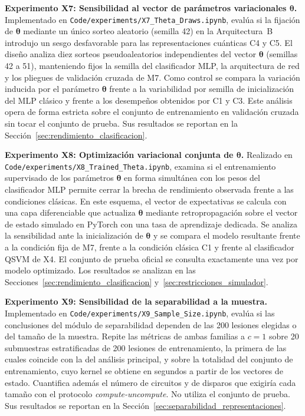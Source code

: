 \textbf{Experimento X7: Sensibilidad al vector de parámetros variacionales $\boldsymbol\theta$.} Implementado en
\texttt{Code/}\allowbreak\texttt{experiments/}\allowbreak\texttt{X7\_Theta\_Draws.ipynb}, evalúa si la fijación de $\boldsymbol\theta$
mediante un único sorteo aleatorio (semilla 42) en la Arquitectura~B introdujo un sesgo desfavorable para las representaciones
cuánticas C4 y C5. El diseño analiza diez sorteos pseudoaleatorios independientes del vector $\boldsymbol\theta$ (semillas 42 a 51),
manteniendo fijos la semilla del clasificador MLP, la arquitectura de red y los pliegues de validación cruzada de M7. Como control
se compara la variación inducida por el parámetro $\boldsymbol\theta$ frente a la variabilidad por semilla de inicialización del
MLP clásico y frente a los desempeños obtenidos por C1 y C3. Este análisis opera de forma estricta sobre el conjunto de entrenamiento
en validación cruzada sin tocar el conjunto de prueba. Sus resultados se reportan en la Sección~\ref{sec:rendimiento_clasificacion}.

\textbf{Experimento X8: Optimización variacional conjunta de $\boldsymbol\theta$.} Realizado en
\texttt{Code/}\allowbreak\texttt{experiments/}\allowbreak\texttt{X8\_Trained\_Theta.ipynb}, examina si el entrenamiento supervisado
de los parámetros $\boldsymbol\theta$ en forma simultánea con los pesos del clasificador MLP permite cerrar la brecha de rendimiento
observada frente a las condiciones clásicas. En este esquema, el vector de expectativas se calcula con una capa diferenciable que actualiza
$\boldsymbol\theta$ mediante retropropagación sobre el vector de estado simulado en PyTorch con una tasa de aprendizaje dedicada. Se
analiza la sensibilidad ante la inicialización de $\boldsymbol\theta$ y se compara el modelo resultante frente a la condición fija
de M7, frente a la condición clásica C1 y frente al clasificador QSVM de X4. El conjunto de prueba oficial se consulta exactamente
una vez por modelo optimizado. Los resultados se analizan en las Secciones~\ref{sec:rendimiento_clasificacion} y~\ref{sec:restricciones_simulador}.

\textbf{Experimento X9: Sensibilidad de la separabilidad a la muestra.} Implementado en
\texttt{Code/}\allowbreak\texttt{experiments/}\allowbreak\texttt{X9\_Sample\_Size.ipynb}, evalúa si las conclusiones del
módulo de separabilidad dependen de las 200 lesiones elegidas o del tamaño de la muestra. Repite las métricas de ambas familias
a $c = 1$ sobre 20 submuestras estratificadas de 200 lesiones de entrenamiento, la primera de las cuales coincide con la del
análisis principal, y sobre la totalidad del conjunto de entrenamiento, cuyo kernel se obtiene en segundos a partir de los
vectores de estado. Cuantifica además el número de circuitos y de disparos que exigiría cada tamaño con el protocolo
\textit{compute-uncompute}. No utiliza el conjunto de prueba. Sus resultados se reportan en la
Sección~\ref{sec:separabilidad_representaciones}.

